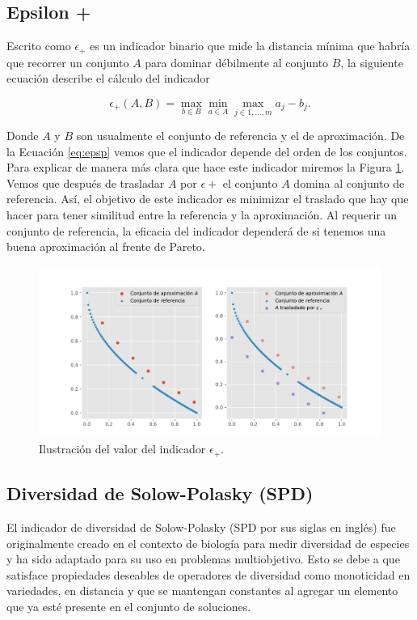 \subsection{Epsilon +} \label{sec:Epsilonp}
Escrito como $\epsilon_+$ \cite{epsilonplus} es un indicador binario que mide la distancia mínima que habría que recorrer un conjunto $A$ para dominar débilmente al conjunto $B$, la siguiente ecuación describe el cálculo del indicador

\begin{equation} \label{eq:epsp}
    \epsilon_+(A,B)= \max_{b\in B} \min_{a\in A}\max_{j\in 1,\ldots, m} a_j-b_j. 
\end{equation}

Donde $A$ y $B$ son usualmente el conjunto de referencia y el de aproximación. De la Ecuación \ref{eq:epsp} vemos que el indicador depende del orden de los conjuntos.
Para explicar de manera más clara que hace este indicador miremos la Figura \ref{fig:epsp}. Vemos que después de trasladar $A$ por $\epsilon+$ el conjunto $A$ domina al conjunto de referencia. Así, el objetivo de este indicador es minimizar el traslado que hay que hacer para tener similitud entre la referencia y la aproximación. Al requerir un conjunto de referencia, la eficacia del indicador dependerá de si tenemos una buena aproximación al frente de Pareto. 

\begin{figure}[H]
    \centering
    \includegraphics[width=\textwidth]{Figuras/epsilon_plus_demo.pdf}
    \caption[$\epsilon+$]{Ilustración del valor del indicador $\epsilon_+$.}
    \label{fig:epsp}
\end{figure}

\subsection{Diversidad de Solow-Polasky (SPD)} \label{sec:SPD} 
El indicador de diversidad de Solow-Polasky (SPD por sus siglas en inglés) fue originalmente creado en el contexto de biología para medir diversidad de especies y ha sido adaptado para su uso en problemas multiobjetivo. Esto se debe a que satisface propiedades deseables de operadores de diversidad \cite{SPD} como monoticidad en variedades, en distancia y que se mantengan constantes al agregar un elemento que ya esté presente en el conjunto de soluciones.

